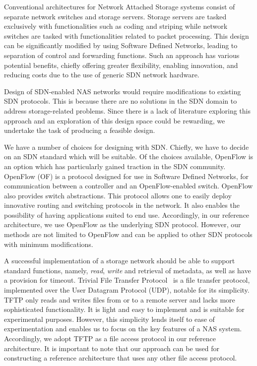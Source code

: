 \indent 
Conventional architectures for Network Attached Storage systems consist of separate network switches and storage servers. Storage servers are tasked exclusively with functionalities such as %
coding and striping while network switches are tasked with functionalities related to packet processing. This design can be significantly modified by using Software Defined Networks, leading to separation of control and forwarding functions. Such an approach has various potential benefits, chiefly offering greater flexibility, enabling innovation, and reducing costs due to the use of generic SDN network hardware.

 Design of SDN-enabled NAS networks would require modifications to existing SDN protocols. This is because there are no solutions in the SDN domain to address storage-related problems. Since there is a lack of literature exploring this approach and an exploration of this design space could be rewarding, we undertake the task of producing a feasible design.

We have a number of choices for designing with SDN. Chiefly, we have to decide on an SDN standard which will be suitable. Of the choices available, OpenFlow \cite{mckeown2008openflow} is an option which has particularly gained traction in the SDN community. %
OpenFlow (OF) is a protocol designed for use in Software Defined Networks, for communication between a controller and an OpenFlow-enabled switch. OpenFlow also provides switch abstractions. 
This protocol allows one to easily deploy innovative routing and switching protocols in the network. It also enables the possibility of having applications suited to end use. Accordingly, in our reference architecture, we use OpenFlow as the underlying SDN protocol. However, our methods are not limited to OpenFlow and can be applied to other SDN protocols with minimum modifications.


A successful implementation of a storage network should be able to support standard functions, namely, \textit{read}, \textit{write} and retrieval of metadata, as well as have a provision for timeout. Trivial File Transfer Protocol~\cite{tftp} is a file transfer protocol, implemented over the User Datagram Protocol (UDP), notable for its simplicity. TFTP only reads and writes files from or to a remote server and lacks more sophisticated functionality. It is light and easy to implement and is suitable for experimental purposes. However, this simplicity lends itself to ease of experimentation and enables us to focus on the key features of a NAS system. Accordingly, we adopt TFTP as a file access protocol in our reference architecture. It is important to note that our approach can be used for constructing a reference architecture that uses any other file access protocol. 

